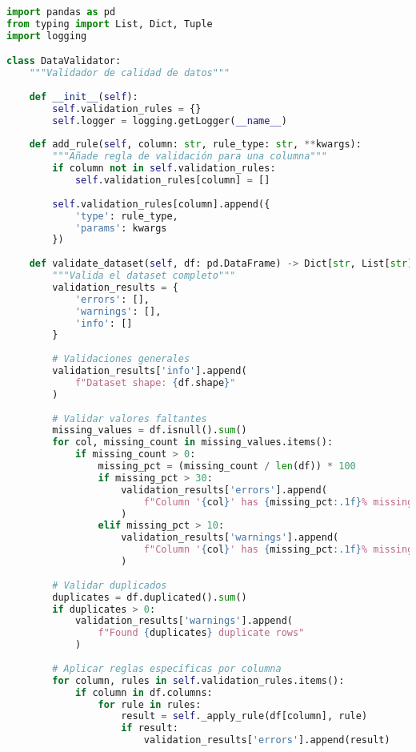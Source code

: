 \begin{lstlisting}[language=Python, caption=Sistema de validación de datos]
import pandas as pd
from typing import List, Dict, Tuple
import logging

class DataValidator:
    """Validador de calidad de datos"""
    
    def __init__(self):
        self.validation_rules = {}
        self.logger = logging.getLogger(__name__)
    
    def add_rule(self, column: str, rule_type: str, **kwargs):
        """Añade regla de validación para una columna"""
        if column not in self.validation_rules:
            self.validation_rules[column] = []
        
        self.validation_rules[column].append({
            'type': rule_type,
            'params': kwargs
        })
    
    def validate_dataset(self, df: pd.DataFrame) -> Dict[str, List[str]]:
        """Valida el dataset completo"""
        validation_results = {
            'errors': [],
            'warnings': [],
            'info': []
        }
        
        # Validaciones generales
        validation_results['info'].append(
            f"Dataset shape: {df.shape}"
        )
        
        # Validar valores faltantes
        missing_values = df.isnull().sum()
        for col, missing_count in missing_values.items():
            if missing_count > 0:
                missing_pct = (missing_count / len(df)) * 100
                if missing_pct > 30:
                    validation_results['errors'].append(
                        f"Column '{col}' has {missing_pct:.1f}% missing values"
                    )
                elif missing_pct > 10:
                    validation_results['warnings'].append(
                        f"Column '{col}' has {missing_pct:.1f}% missing values"
                    )
        
        # Validar duplicados
        duplicates = df.duplicated().sum()
        if duplicates > 0:
            validation_results['warnings'].append(
                f"Found {duplicates} duplicate rows"
            )
        
        # Aplicar reglas específicas por columna
        for column, rules in self.validation_rules.items():
            if column in df.columns:
                for rule in rules:
                    result = self._apply_rule(df[column], rule)
                    if result:
                        validation_results['errors'].append(result)
        

\end{lstlisting}
